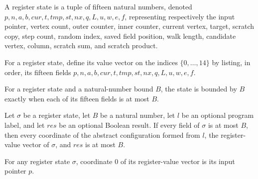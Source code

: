 \begin{definition}
\label{Complexity.LogProg.UReg}
\leanok
A register state is a tuple of fifteen natural numbers, denoted
$p,n,a,b,cur,t,tmp,st,nx,q,L,u,w,e,f$, representing respectively the input pointer,
vertex count, outer counter, inner counter, current vertex, target, scratch copy, step
count, random index, saved field position, walk length, candidate vertex, column,
scratch sum, and scratch product.
\end{definition}

\begin{definition}
\label{Complexity.LogProg.UReg.v}
\leanok
{}
For a register state, define its value vector on the indices $\{0,\ldots,14\}$ by listing, in order,
its fifteen fields $p,n,a,b,cur,t,tmp,st,nx,q,L,u,w,e,f$.
\end{definition}

\begin{definition}
\label{Complexity.LogProg.UReg.Le}
\leanok
{}
For a register state and a natural-number bound $B$, the state is bounded by $B$ exactly
when each of its fifteen fields is at most $B$.
\end{definition}

\begin{lemma}
\label{Complexity.LogProg.UReg.reg}
\leanok
{}
Let $\sigma$ be a register state, let $B$ be a natural number, let $l$ be an optional
program label, and let $res$ be an optional Boolean result. If every field of $\sigma$
is at most $B$, then every coordinate of the abstract configuration formed from $l$, the
register-value vector of $\sigma$, and $res$ is at most $B$.
\end{lemma}

\begin{lemma}
\label{Complexity.LogProg.UReg.v_0}
\leanok
{}
For any register state $\sigma$, coordinate $0$ of its register-value vector is its
input pointer $p$.
\end{lemma}

